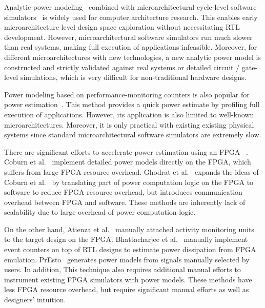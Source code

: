 Analytic power modeling~\cite{Brooks2000, Vijaykrishnan2000, Li2009, Leng2013, Shao2014}
combined with microarchitectural cycle-level software simulators~\cite{Binkert2011, Patel2011, Wenisch2006}
is widely used for computer architecture research. This enables early microarchitecture-level
design space exploration without necessitating RTL development. However, microarchitectural
software simulators run much slower than real systems, making full execution of applications infeasible.
Moreover, for different microarchitectures with new technologies, a new analytic power model
is constructed and strictly validated against real systems or detailed circuit / gate-level simulations,
which is very difficult for non-traditional hardware designs.

Power modeling based on performance-monitoring counters is also
popular for power estimation~\cite{Bellosa2000, Bircher2003, Isci2003,
  Bircher2005, Bircher2007, Bertran2013}.  This method provides a
quick power estimate by profiling full execution of applications.
However, its application is also limited to well-known microarchitectures.
Moreover, it is only practical with existing existing physical systems since
standard microarchitectural software simulators are extremely slow.

There are significant efforts to accelerate power estimation using an FPGA
~\cite{Coburn2005, Ghodrat2007, Atienza2006, Bhattacharjee2008, Sunwoo2010, Yang2015, Kim2016}.
Coburn et al.~\cite{Coburn2005} implement detailed power models directly on the FPGA,
which suffers from large FPGA resource overhead. Ghodrat et al.~\cite{Ghodrat2007}
expands the ideas of Coburn et al.~\cite{Coburn2005} by translating part of 
power computation logic on the FPGA to software to reduce FPGA resource overhead,
but introduces communication overhead between FPGA and software. These methods
are inherently lack of scalability due to large overhead of power computation logic. 

On the other hand, Atienza et al.~\cite{Atienza2006} manually attached activity monitoring units
to the target design on the FPGA. Bhattacharjee et al.~\cite{Bhattacharjee2008} manually implement
event counters on top of RTL designs to estimate power dissipation from FPGA emulation.
PrEsto~\cite{Sunwoo2010} generates power models from signals manually selected by users.
In addition, This technique also requires additional manual efforts to instrument existing
FPGA simulators with power models. These methods have less FPGA resource overhead,
but require significant manual efforts as well as designers' intuition.


